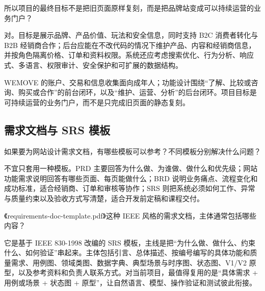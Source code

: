 \documentclass[UTF8,a4paper,11pt]{ctexart}
\begin{document}
\begin{membermsg}
所以项目的最终目标不是把旧页面原样复刻，而是把品牌站变成可以持续运营的业务门户？
\end{membermsg}

\begin{gptmsg}
对。目标是展示品牌、产品价值、玩法和安全信息，同时支持 B2C 消费者转化与 B2B 经销商合作；后台应能在不改代码的情况下维护产品、内容和经销商信息，并按角色隔离价格、订单和资料权限。系统还应考虑搜索优化、行为分析、响应式、多语言、权限审计、安全保护和可扩展的数据结构。
\end{gptmsg}

\begin{decisionbox}
WEMOVE 的账户、交易和信息收集面向成年人；功能设计围绕“了解、比较或咨询、购买或合作”的前台闭环，以及“维护、运营、分析”的后台闭环。项目目标是可持续运营的业务门户，而不是只完成旧页面的静态复刻。
\end{decisionbox}

\subsection{需求文档与 SRS 模板}

\begin{membermsg}
如果要为网站设计需求文档，有哪些模板可以参考？不同模板分别解决什么问题？
\end{membermsg}

\begin{gptmsg}
不宜只套用一种模板。PRD 主要回答为什么做、为谁做、做什么和优先级；网站功能需求说明回答有哪些页面、每页能做什么；BRD 说明业务痛点、流程变化和成功标准，适合经销商、订单和审核等协作；SRS 则把系统必须如何工作、异常与质量约束以及验收方式写清楚，适合开发前定稿和课程交付。
\end{gptmsg}

\begin{membermsg}
《requirements-doc-template.pdf》这种 IEEE 风格的需求文档，主体通常包括哪些内容？
\end{membermsg}

\begin{gptmsg}
它是基于 IEEE 830-1998 改编的 SRS 模板，主线是把“为什么做、做什么、约束什么、如何验证”串起来。主体包括引言、总体描述、按编号编写的具体功能和质量需求、用例图、领域类图、数据字典、典型场景与时序图、状态图、V1/V2 原型，以及参考资料和负责人联系方式。对当前项目，最值得复用的是“具体需求 + 用例或场景 + 状态图 + 原型”，让自然语言、模型、操作验证和测试彼此衔接。
\end{gptmsg}
\end{document}
